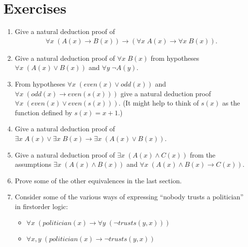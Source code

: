 \documentclass[letterpaper,10pt,english]{sphinxmanual}
\begin{document}
\section{Exercises}
\label{\detokenize{natural_deduction_for_first_order_logic:exercises}}\begin{enumerate}
%
\item {} 
\sphinxAtStartPar
Give a natural deduction proof of
\begin{equation*}
\begin{split}\forall x \; (A(x) \to B(x)) \to (\forall x \; A(x) \to \forall x \; B(x)).\end{split}
\end{equation*}
\item {} 
\sphinxAtStartPar
Give a natural deduction proof of \(\forall x \; B(x)\) from hypotheses \(\forall x \; (A(x) \vee B(x))\) and \(\forall y \; \neg A(y)\).

\item {} 
\sphinxAtStartPar
From hypotheses \(\forall x \; (\mathit{even}(x) \vee \mathit{odd}(x))\) and \(\forall x \; (\mathit{odd}(x) \to \mathit{even}(s(x)))\) give a natural deduction proof \(\forall x \; (\mathit{even}(x) \vee \mathit{even}(s(x)))\). (It might help to think of \(s(x)\) as the function defined by \(s(x) = x + 1\).)

\item {} 
\sphinxAtStartPar
Give a natural deduction proof of \(\exists x \; A(x) \vee \exists x \; B(x) \to \exists x \; (A(x) \vee B(x))\).

\item {} 
\sphinxAtStartPar
Give a natural deduction proof of \(\exists x \; (A(x) \wedge C(x))\) from the assumptions \(\exists x \; (A(x) \wedge B(x))\) and \(\forall x \; (A(x) \wedge B(x) \to C(x))\).

\item {} 
\sphinxAtStartPar
Prove some of the other equivalences in the last section.

\item {} 
\sphinxAtStartPar
Consider some of the various ways of expressing “nobody trusts a politician” in first\sphinxhyphen{}order logic:
\begin{itemize}
\item {} 
\sphinxAtStartPar
\(\forall x \; (\mathit{politician}(x) \to \forall y \; (\neg \mathit{trusts}(y,x)))\)

\item {} 
\sphinxAtStartPar
\(\forall x,y \; (\mathit{politician}(x) \to \neg \mathit{trusts}(y,x))\)


\end{itemize}
\end{enumerate}
\end{document}
